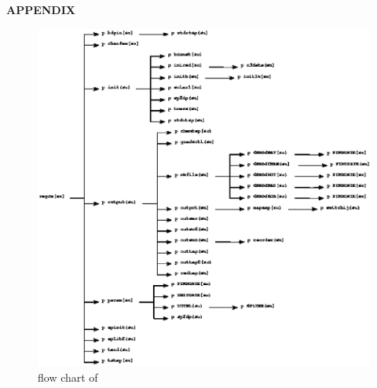 \appendix
\begin{center}
{\bf APPENDIX}
\end{center}


\begin{figure}
\begin{center}
\includegraphics{xref1.fixed.eps}
\end{center}
\caption{flow chart of }  \label{grid}
\end{figure}

